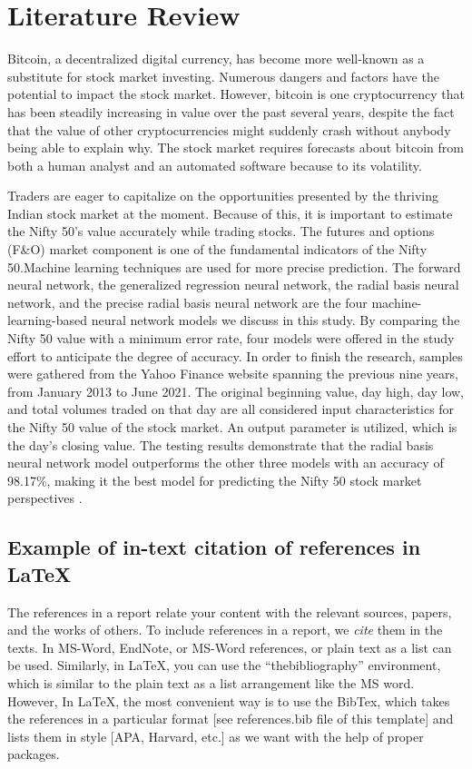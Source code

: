\chapter{Literature Review}
\label{ch:lit_rev} %

Bitcoin, a decentralized digital currency, has become more well-known as a substitute for stock market investing. Numerous dangers and factors have the potential to impact the stock market. However, bitcoin is one cryptocurrency that has been steadily increasing in value over the past several years, despite the fact that the value of other cryptocurrencies might suddenly crash without anybody being able to explain why. The stock market requires forecasts about bitcoin from both a human analyst and an automated software because to its volatility. 

Traders are eager to capitalize on the opportunities presented by the thriving Indian stock market at the moment. Because of this, it is important to estimate the Nifty 50's value accurately while trading stocks. The futures and options (F\&O) market component is one of the fundamental indicators of the Nifty 50.Machine learning techniques are used for more precise prediction. The forward neural network, the generalized regression neural network, the radial basis neural network, and the precise radial basis neural network are the four machine-learning-based neural network models we discuss in this study. By comparing the Nifty 50 value with a minimum error rate, four models were offered in the study effort to anticipate the degree of accuracy. In order to finish the research, samples were gathered from the Yahoo Finance website spanning the previous nine years, from January 2013 to June 2021. The original beginning value, day high, day low, and total volumes traded on that day are all considered input characteristics for the Nifty 50 value of the stock market. An output parameter is utilized, which is the day's closing value. The testing results demonstrate that the radial basis neural network model outperforms the other three models with an accuracy of 98.17\%, making it the best model for predicting the Nifty 50 stock market perspectives \cite{lamba2021comparative}.


\section{Example of in-text citation of references in \LaTeX} 
The references in a report relate your content with the relevant sources, papers, and the works of others. To include references in a report, we \textit{cite} them in the texts. In MS-Word, EndNote, or MS-Word references, or plain text as a list can be used. Similarly, in \LaTeX, you can use the ``thebibliography'' environment, which is similar to the plain text as a list arrangement like the MS word. However, In \LaTeX, the most convenient way is to use the BibTex, which takes the references in a particular format [see references.bib file of this template] and lists them in style [APA, Harvard, etc.] as we want with the help of proper packages.    

